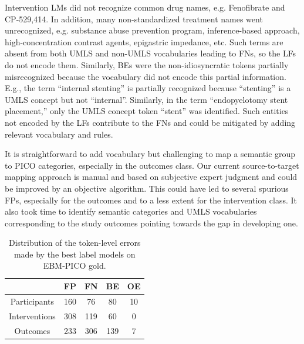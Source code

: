 \documentclass[10.7pt,]{article}
\begin{document}
Intervention LMs did not recognize common drug names, e.g. Fenofibrate and CP-529,414.
In addition, many non-standardized treatment names went unrecognized, e.g. substance abuse prevention program, inference-based approach, high-concentration contrast agents, epigastric impedance, etc.
Such terms are absent from both UMLS and non-UMLS vocabularies leading to FNs, so the LFs do not encode them.
Similarly, BEs were the non-idiosyncratic tokens partially misrecognized because the vocabulary did not encode this partial information.
E.g., the term ``internal stenting'' is partially recognized because ``stenting'' is a UMLS concept but not ``internal''.
Similarly, in the term ``endopyelotomy stent placement,'' only the UMLS concept token ``stent'' was identified.
Such entities not encoded by the LFs contribute to the FNs and could be mitigated by adding relevant vocabulary and rules.\cite{augenstein2017generalisation}

It is straightforward to add vocabulary but challenging to map a semantic group to PICO categories, especially in the outcomes class.
Our current source-to-target mapping approach is manual and based on subjective expert judgment and could be improved by an objective algorithm.
This could have led to several spurious FPs, especially for the outcomes and to a less extent for the intervention class.
It also took time to identify semantic categories and UMLS vocabularies corresponding to the study outcomes pointing towards the gap in developing one.
%
\begin{table}[h!]
\begin{center}
\begin{tabular}{| c | c | c | c | c |} 
\hline
 & FP & FN & BE & OE \\ 
\hline
Participants & 160 & 76 & 80 & 10 \\ 
Interventions & 308 & 119 & 60 & 0 \\ 
Outcomes & 233 & 306 & 139 & 7 \\ 
\hline
\end{tabular}
\caption{\label{tab:error_ner} Distribution of the token-level errors made by the best label models on EBM-PICO gold.}
\end{center}
\end{table}
%
%
%
\end{document}
